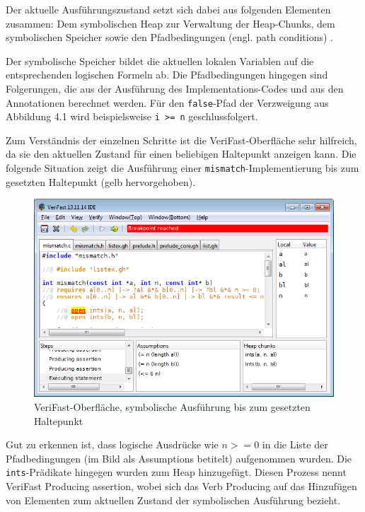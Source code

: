 Der aktuelle Ausführungszustand setzt sich dabei aus folgenden Elementen zusammen: 
Dem symbolischen Heap zur Verwaltung der Heap-Chunks, dem symbolischen Speicher sowie den Pfadbedingungen
(engl. path conditions) \cite[Kap. 2]{jacobs-2010}. 

Der symbolische Speicher bildet die aktuellen lokalen Variablen auf die entsprechenden logischen Formeln ab.
Die Pfadbedingungen hingegen sind Folgerungen, die aus der Ausführung des Implementations-Codes und aus den Annotationen
berechnet werden. Für den \texttt{false}-Pfad der Verzweigung aus Abbildung 4.1 wird beispielsweise
\lstinline{i >= n} geschlussfolgert.

Zum Verständnis der einzelnen Schritte ist die VeriFast-Oberfläche sehr hilfreich, da sie den aktuellen
Zustand für einen beliebigen Haltepunkt anzeigen kann. Die folgende Situation zeigt die Ausführung
einer \lstinline{mismatch}-Implementierung bis zum gesetzten Haltepunkt (gelb hervorgehoben).

\begin{figure}[ht]
\centering
\includegraphics[width=1.0\textwidth]{images/VeriFast-state-after-precondition.png}
\caption{VeriFast-Oberfläche, symbolische Ausführung bis zum gesetzten Haltepunkt}
\end{figure}

Gut zu erkennen ist, dass logische Ausdrücke wie \(n >= 0\) in die Liste der Pfadbedingungen 
(im Bild als \glqq Assumptions\grqq{} betitelt) aufgenommen wurden. Die \lstinline{ints}-Prädikate hingegen
wurden zum Heap hinzugefügt. Diesen Prozess nennt VeriFast \glqq Producing assertion\grqq, wobei sich das Verb
\glqq Producing\grqq{} auf das Hinzufügen von Elementen zum aktuellen Zustand der symbolischen Ausführung
bezieht.

